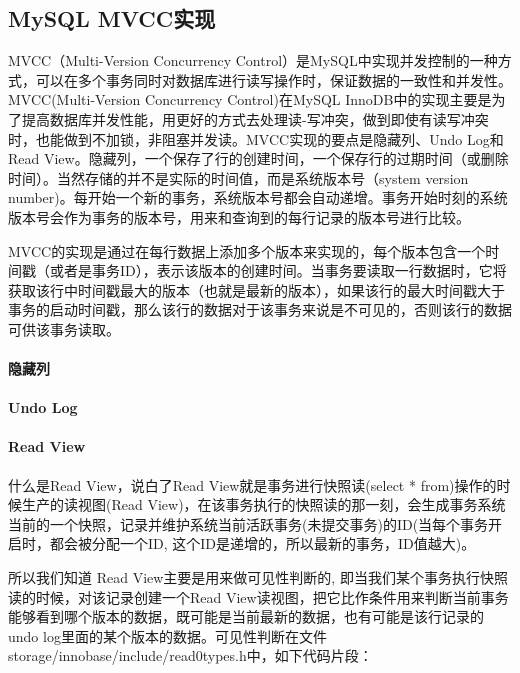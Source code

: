\documentclass[../../../interview-questions.tex]{subfiles}
\begin{document}
\subsection{MySQL MVCC实现}

MVCC（Multi-Version Concurrency Control）是MySQL中实现并发控制的一种方式，可以在多个事务同时对数据库进行读写操作时，保证数据的一致性和并发性。MVCC(Multi-Version Concurrency Control)在MySQL InnoDB中的实现主要是为了提高数据库并发性能，用更好的方式去处理读-写冲突，做到即使有读写冲突时，也能做到不加锁，非阻塞并发读。MVCC实现的要点是隐藏列、Undo Log和Read View。隐藏列，一个保存了行的创建时间，一个保存行的过期时间（或删除时间）。当然存储的并不是实际的时间值，而是系统版本号（system version number)。每开始一个新的事务，系统版本号都会自动递增。事务开始时刻的系统版本号会作为事务的版本号，用来和查询到的每行记录的版本号进行比较。

MVCC的实现是通过在每行数据上添加多个版本来实现的，每个版本包含一个时间戳（或者是事务ID），表示该版本的创建时间。当事务要读取一行数据时，它将获取该行中时间戳最大的版本（也就是最新的版本），如果该行的最大时间戳大于事务的启动时间戳，那么该行的数据对于该事务来说是不可见的，否则该行的数据可供该事务读取。

\paragraph{隐藏列}

\paragraph{Undo Log}

\paragraph{Read View}

什么是Read View，说白了Read View就是事务进行快照读(select * from)操作的时候生产的读视图(Read View)，在该事务执行的快照读的那一刻，会生成事务系统当前的一个快照，记录并维护系统当前活跃事务(未提交事务)的ID(当每个事务开启时，都会被分配一个ID, 这个ID是递增的，所以最新的事务，ID值越大)。

所以我们知道 Read View主要是用来做可见性判断的, 即当我们某个事务执行快照读的时候，对该记录创建一个Read View读视图，把它比作条件用来判断当前事务能够看到哪个版本的数据，既可能是当前最新的数据，也有可能是该行记录的undo log里面的某个版本的数据。可见性判断在文件storage/innobase/include/read0types.h中，如下代码片段：
\end{document}
